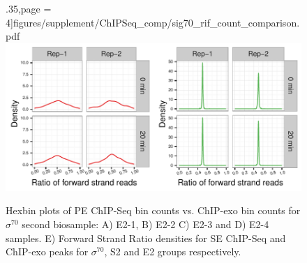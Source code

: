 \documentclass{article}
\begin{document}
\begin{figure}[H]
  .35\textwidth,page = 4]{figures/supplement/ChIPSeq_comp/sig70_rif_count_comparison.pdf}
  \includegraphics[width =
  .9\textwidth]{figures/supplement/ChIPSeq_comp/Sig70_strand_imbalance_rif.pdf}
  \caption{Hexbin plots of PE ChIP-Seq bin counts vs. ChIP-exo bin
    counts for $\sigma^{70}$ second biosample: A) E2-1, B) E2-2 C)
    E2-3 and D) E2-4 samples. E) Forward Strand Ratio densities for SE
    ChIP-Seq and ChIP-exo peaks for $\sigma^{70}$, S2 and E2 groups
    respectively.}
  \label{sfig:comp1}
\end{figure}
\end{document}
